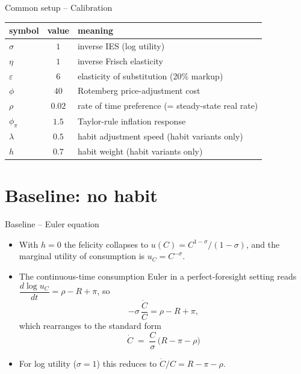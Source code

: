 \documentclass[11pt,aspectratio=169]{beamer}
\begin{document}
\begin{frame}{Common setup -- Calibration}

\begin{center}
\small
\renewcommand{\arraystretch}{1.3}
\begin{tabular}{lcl}
\toprule
symbol & value & meaning \\
\midrule
$\sigma$    & $1$    & inverse IES (log utility) \\
$\eta$      & $1$    & inverse Frisch elasticity \\
$\varepsilon$ & $6$  & elasticity of substitution (20\% markup) \\
$\phi$      & $40$   & Rotemberg price-adjustment cost \\
$\rho$      & $0.02$ & rate of time preference (= steady-state real rate) \\
$\phi_\pi$  & $1.5$  & Taylor-rule inflation response \\
$\lambda$   & $0.5$  & habit adjustment speed (habit variants only) \\
$h$         & $0.7$  & habit weight (habit variants only) \\
\bottomrule
\end{tabular}
\end{center}

\end{frame}

\section{Baseline: no habit}

\begin{frame}{Baseline -- Euler equation}

\begin{itemize}

\item With $h=0$ the felicity collapses to
  $u(C) = C^{1-\sigma}/(1-\sigma)$, and the marginal utility of
  consumption is $u_C = C^{-\sigma}$.\newline

\item The continuous-time consumption Euler in a perfect-foresight
  setting reads $\dfrac{d\log u_C}{dt} = \rho - R + \pi$, so
  \[
  -\sigma\,\frac{\dot C}{C} = \rho - R + \pi,
  \]
  which rearranges to the standard form
  \[
  \boxed{\dot C \;=\; \frac{C}{\sigma}\,\bigl(R - \pi - \rho\bigr)}
  \]

\item For log utility ($\sigma=1$) this reduces to
  $\dot C/C = R - \pi - \rho$.

\end{itemize}

\end{frame}
\end{document}
